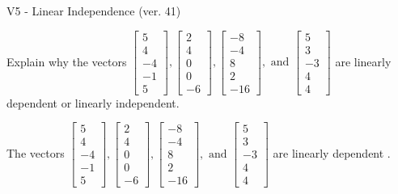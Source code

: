 \begin{exercise}
  \begin{exerciseTitle}V5 - Linear Independence (ver. 41)\end{exerciseTitle}
  \begin{exerciseStatement}
    Explain why the vectors \(\left[\begin{array}{r}
5 \\
4 \\
-4 \\
-1 \\
5
\end{array}\right] , \left[\begin{array}{r}
2 \\
4 \\
0 \\
0 \\
-6
\end{array}\right] , \left[\begin{array}{r}
-8 \\
-4 \\
8 \\
2 \\
-16
\end{array}\right] , \text{ and } \left[\begin{array}{r}
5 \\
3 \\
-3 \\
4 \\
4
\end{array}\right]\) are linearly dependent or linearly independent.	


  \end{exerciseStatement}
  \begin{exerciseAnswer}
   The vectors \(\left[\begin{array}{r}
5 \\
4 \\
-4 \\
-1 \\
5
\end{array}\right] , \left[\begin{array}{r}
2 \\
4 \\
0 \\
0 \\
-6
\end{array}\right] , \left[\begin{array}{r}
-8 \\
-4 \\
8 \\
2 \\
-16
\end{array}\right] , \text{ and } \left[\begin{array}{r}
5 \\
3 \\
-3 \\
4 \\
4
\end{array}\right]\) are 
  	 linearly dependent  .
  


  \end{exerciseAnswer}
\end{exercise}
